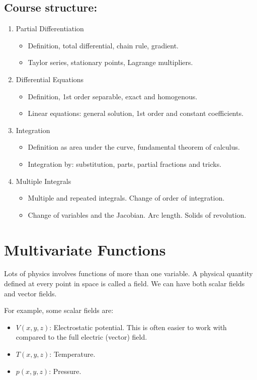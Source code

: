 \subsection{Course structure:}
\begin{enumerate}
    \item Partial Differentiation
    \begin{itemize}
        \item Definition, total differential, chain rule, gradient.
        \item Taylor series, stationary points, Lagrange multipliers.
    \end{itemize}
    \item Differential Equations
    \begin{itemize}
        \item Definition, 1st order separable, exact and homogenous.
        \item Linear equations: general solution, 1st order and constant coefficients.
    \end{itemize}
    \item Integration
    \begin{itemize}
        \item Definition as area under the curve, fundamental theorem of calculus.
        \item Integration by: substitution, parts, partial fractions and tricks.
    \end{itemize}
    \item Multiple Integrals
    \begin{itemize}
        \item Multiple and repeated integrals. Change of order of integration.
        \item Change of variables and the Jacobian. Arc length. Solids of revolution.
    \end{itemize}
\end{enumerate}

\section{Multivariate Functions}
Lots of physics involves functions of more than one variable. A physical quantity defined at every point in space is called a field. We can have both scalar fields and vector fields.

For example, some scalar fields are:
\begin{itemize}
    \item $V(x, y, z)$: Electrostatic potential. This is often easier to work with compared to the full electric (vector) field.
    \item $T(x, y, z)$: Temperature.
    \item $p(x, y, z)$: Pressure.
\end{itemize}

